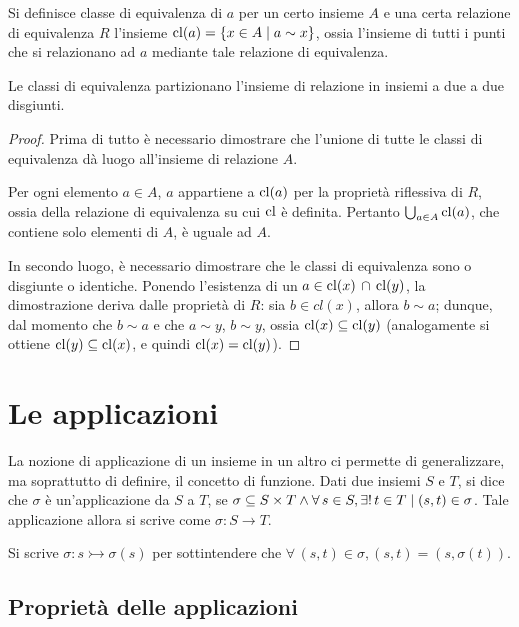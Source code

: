 Si definisce classe di equivalenza di $a$ per un certo insieme
$A$ e una certa relazione di equivalenza $R$ l'insieme
$\operatorname{cl}(a)=\{x \in A \mid a \sim x\}$, ossia l'insieme di tutti i punti che
si relazionano ad $a$ mediante tale relazione di equivalenza.

\begin{theorem}
    Le classi di equivalenza partizionano l'insieme di relazione
    in insiemi a due a due disgiunti.
\end{theorem}

\begin{proof}
    Prima di tutto è necessario dimostrare che l'unione di tutte
    le classi di equivalenza dà luogo all'insieme di relazione $A$.

    Per ogni elemento $a \in A$, $a$ appartiene a $\operatorname{cl}(a)$ per la proprietà
    riflessiva di $R$, ossia della relazione di equivalenza su cui
    $\operatorname{cl}$ è definita. Pertanto $\bigcup_{a \in A} \operatorname{cl}(a)$, che contiene solo
    elementi di $A$, è uguale ad $A$.

    In secondo luogo, è necessario dimostrare che le classi di equivalenza
    sono o disgiunte o identiche. Ponendo l'esistenza
    di un $a \in \operatorname{cl}(x) \, \cap \, \operatorname{cl}(y)$, la dimostrazione deriva dalle proprietà
    di $R$: sia $b \in cl(x)$, allora $b \sim a$; dunque, dal momento che $b \sim a$ e che
    $a \sim y$, $b \sim y$, ossia $\operatorname{cl}(x) \subseteq \operatorname{cl}(y)$ (analogamente si ottiene
    $\operatorname{cl}(y) \subseteq \operatorname{cl}(x)$, e quindi $\operatorname{cl}(x) = \operatorname{cl}(y)$).
\end{proof}

\section{Le applicazioni}

La nozione di applicazione di un insieme in un altro ci permette
di generalizzare, ma soprattutto di definire, il concetto di
funzione. Dati due insiemi $S$ e $T$, si dice che $\sigma$ è un'applicazione
da $S$ a $T$, se $\sigma \subseteq S \times T \land \forall s \in S, \existsone
    t \in T \mid (s, t) \in \sigma$. Tale applicazione allora si scrive come
$\sigma : S \rightarrow T$.

Si scrive $\sigma : s \rightarrowtail \sigma(s)$ per sottintendere che
$\forall \, (s, t) \in \sigma, (s, t) = (s, \sigma(t))$.

\subsection{Proprietà delle applicazioni}


